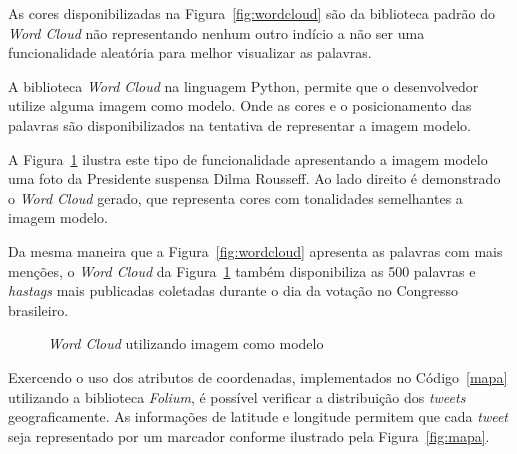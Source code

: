 As cores disponibilizadas na Figura~\ref{fig:wordcloud} são da biblioteca padrão do \textit{Word Cloud} não representando nenhum outro indício a não ser uma funcionalidade aleatória para melhor visualizar as palavras.

A biblioteca \textit{Word Cloud} na linguagem Python, permite que o desenvolvedor utilize alguma imagem como modelo. Onde as cores e o posicionamento das palavras são disponibilizados na tentativa de representar a imagem modelo.

A Figura~\ref{fig:worddilma} ilustra este tipo de funcionalidade apresentando a imagem modelo uma foto da Presidente suspensa Dilma Rousseff. Ao lado direito é demonstrado o \textit{Word Cloud} gerado, que representa cores com tonalidades semelhantes a imagem modelo.

Da mesma maneira que a Figura~\ref{fig:wordcloud} apresenta as palavras com mais menções, o \textit{Word Cloud} da Figura~\ref{fig:worddilma} também disponibiliza as 500 palavras e \textit{hastags} mais publicadas coletadas durante o dia da votação no Congresso brasileiro.

\begin{figure}[h]
	\centering
	\vspace{-0.2cm}
	\caption{\textit{Word Cloud} utilizando imagem como modelo}
	\label{fig:worddilma}
\end{figure}

Exercendo o uso dos atributos de coordenadas, implementados no Código~\ref{mapa} utilizando a biblioteca \textit{Folium}, é possível verificar a distribuição dos \textit{tweets} geograficamente. As informações de latitude e longitude permitem que cada \textit{tweet} seja representado por um marcador conforme ilustrado pela Figura~\ref{fig:mapa}.

